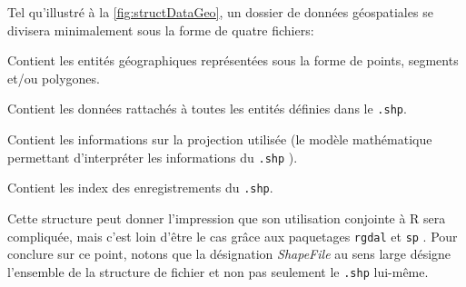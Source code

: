 
Tel qu'illustré à la \autoref{fig:structDataGeo}, un dossier de données géospatiales se divisera minimalement sous la forme de quatre fichiers:
\begin{description}[style=multiline,leftmargin=1.5cm]
	\item[\texttt{.shp}] Contient les entités géographiques représentées sous la forme de points, segments et/ou polygones.
	\item[\texttt{.dbf}] Contient les données rattachés à toutes les entités définies dans le \texttt{.shp}.
	\item[\texttt{.prj}] Contient les informations sur la projection utilisée (le modèle mathématique permettant d'interpréter les informations du \texttt{.shp} \cite{projectionSIG}).
	\item[{.shx}] Contient les index des enregistrements du \texttt{.shp}.
\end{description}
Cette structure peut donner l'impression que son utilisation conjointe à R sera compliquée, mais c'est loin d'être le cas grâce aux paquetages \texttt{rgdal} \cite{Rpackage:rgdal} et \texttt{sp}\cite{Rpackage:sp} . Pour conclure sur ce point, notons que la désignation \emph{ShapeFile} au sens large désigne l'ensemble de la structure de fichier et non pas seulement le \texttt{.shp} lui-même. \cite{portailSIG} \\

